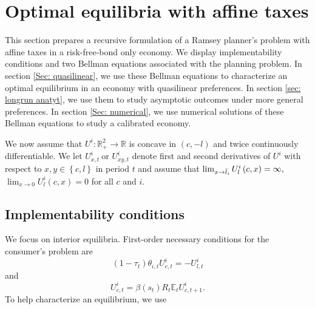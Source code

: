 \documentclass[thmsb,11pt]{article}
\begin{document}
\section{Optimal equilibria with affine taxes\label{Sec: characterization}}

This section prepares a recursive formulation of a Ramsey planner's problem with affine taxes in a risk-free-bond only economy. We  display
implementability conditions and two  Bellman equations associated with the planning problem.
 In section \ref{Sec: quasilinear}, we use these Bellman equations to characterize an optimal equilibrium in an economy with quasilinear preferences. In section \ref{sec: longrun anatyt},  we use them to study asymptotic outcomes under more general preferences.     In section \ref{Sec: numerical}, we use numerical solutions of these Bellman equations to study a calibrated economy.


 We now assume that $U^{i}:\mathbb{R}%
_{+}^{2}\rightarrow \mathbb{R}$ is concave in $\left( c,-l\right) $ and
twice continuously differentiable. We let $U_{x,t}^{i}\ $or $U_{xy,t}^{i}$
denote first and second derivatives of $U^{i}$ with respect to $x,y\in
\left\{ c,l\right\} $ in period $t$ and assume that $\lim_{x\rightarrow \bar{%
l}_{i}}U_{l}^{i}\left( c,x\right) =\infty ,$ $\lim_{x\rightarrow
0}U_{l}^{i}\left( c,x\right) =0$ for all $c$ and $i.$

\subsection{Implementability conditions\label{Sec: impl and Bellman}}

We focus on  interior equilibria. First-order necessary conditions for the  consumer's problem
 are%
\begin{equation}
\left( 1-\tau _{t}\right) \theta _{i,t}U_{c,t}^{i}=-U_{l,t}^{i}
\label{FOC consumption labor}
\end{equation}%
and%
\begin{equation}
U_{c,t}^{i}=\beta(s_t) R_{t}\mathbb{E}_{t}U_{c,t+1}^{i}.  \label{FOC Euler}
\end{equation}%
To help characterize an equilibrium, we use
\end{document}
